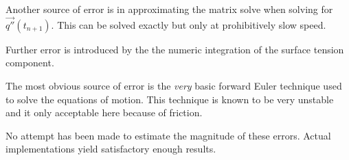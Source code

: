 \documentclass{article}
\begin{document}
Another source of error is in approximating the matrix solve when solving for
$\vec{q''}(t_{n+1})$. This can be solved exactly but only at prohibitively slow
speed.

Further error is introduced by the the numeric integration of the surface
tension component.

The most obvious source of error is the \emph{very} basic forward Euler
technique used to solve the equations of motion. This technique is known to be
very unstable and it only acceptable here because of friction.

No attempt has been made to estimate the magnitude of these errors. Actual
implementations yield satisfactory enough results.
\end{document}
